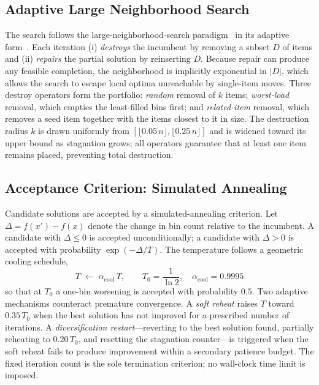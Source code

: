 \documentclass[conference]{IEEEtran}
\begin{document}
\subsection{Adaptive Large Neighborhood Search}
The search follows the large-neighborhood-search paradigm~\cite{bShaw} in its
adaptive form~\cite{bRopke}. Each iteration (i) \emph{destroys} the incumbent by
removing a subset $D$ of items and (ii) \emph{repairs} the partial solution by
reinserting $D$. Because repair can produce any feasible completion, the
neighborhood is implicitly exponential in $|D|$, which allows the search to escape
local optima unreachable by single-item moves. Three destroy operators form the
portfolio: \emph{random} removal of $k$ items; \emph{worst-load} removal, which
empties the least-filled bins first; and \emph{related-item} removal, which
removes a seed item together with the items closest to it in size. The destruction
radius $k$ is drawn uniformly from $[\lfloor 0.05\,n\rfloor,\lfloor 0.25\,n\rfloor]$
and is widened toward its upper bound as stagnation grows; all operators guarantee
that at least one item remains placed, preventing total destruction.

\subsection{Acceptance Criterion: Simulated Annealing}\label{sec:sa}

Candidate solutions are accepted by a simulated-annealing criterion.  Let
$\Delta = f(x') - f(x)$ denote the change in bin count relative to the
incumbent.  A candidate with $\Delta\le0$ is accepted unconditionally; a
candidate with $\Delta>0$ is accepted with probability $\exp(-\Delta/T)$.  The
temperature follows a geometric cooling schedule,
%
\begin{equation}
	T \;\leftarrow\; \alpha_{\mathrm{cool}}\,T,
	\qquad T_0 = \frac{1}{\ln 2},\quad
	\alpha_{\mathrm{cool}} = 0.9995
	\label{eq:sa}
\end{equation}
%
so that at $T_0$ a one-bin worsening is accepted with probability $0.5$.  Two
adaptive mechanisms counteract premature convergence.  A \emph{soft reheat}
raises $T$ toward $0.35\,T_0$ when the best solution has not improved for a
prescribed number of iterations.  A \emph{diversification restart}---reverting
to the best solution found, partially reheating to $0.20\,T_0$, and resetting
the stagnation counter---is triggered when the soft reheat fails to produce
improvement within a secondary patience budget.  The fixed iteration count is
the sole termination criterion; no wall-clock time limit is imposed.
\end{document}
